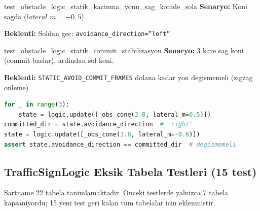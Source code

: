 \documentclass[a4paper,12pt]{article}
\begin{document}
\begin{testbox}{test\_obstacle\_logic\_statik\_kacinma\_yonu\_sag\_konide\_sola}
\textbf{Senaryo:} Koni sagda ($lateral\_m=-0{,}5$).

\textbf{Beklenti:} Soldan gec: \texttt{avoidance\_direction=''left''}
\end{testbox}

\begin{testbox}{test\_obstacle\_logic\_statik\_commit\_stabilizasyon}
\textbf{Senaryo:} 3 kare sag koni (commit baslar), ardindan sol koni.

\textbf{Beklenti:} \texttt{STATIC\_AVOID\_COMMIT\_FRAMES} dolana kadar
yon degismemeli (zigzag onleme).

\begin{lstlisting}[language=Python]
for _ in range(3):
    state = logic.update([_obs_cone(2.0, lateral_m=0.5)])
committed_dir = state.avoidance_direction  # 'right'
state = logic.update([_obs_cone(1.8, lateral_m=-0.6)])
assert state.avoidance_direction == committed_dir  # degismemeli
\end{lstlisting}
\end{testbox}

\subsection{TrafficSignLogic Eksik Tabela Testleri (15 test)}

Sartname 22 tabela tanimlamaktadir. Onceki testlerde yalnizca 7 tabela
kapsaniyordu; 15 yeni test geri kalan tum tabelalar icin eklenmistir.
\end{document}
